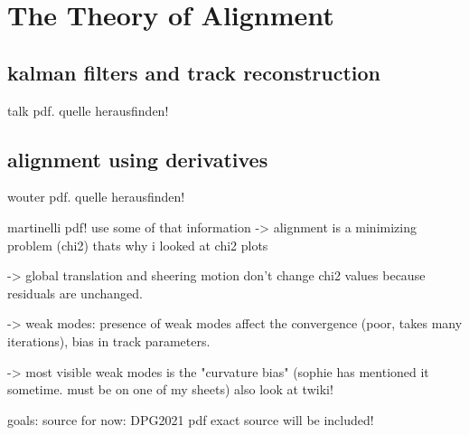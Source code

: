 \chapter{The Theory of Alignment}
\label{sec:alignTheory}

\section{kalman filters and track reconstruction}
\label{sec:kalman}
talk pdf. quelle herausfinden!
\section{alignment using derivatives}
\label{sec:derivatives}
wouter pdf. quelle herausfinden!

martinelli pdf! use some of that information
-> alignment is a minimizing problem (chi2) thats why i looked at chi2 plots

-> global translation and sheering motion don't change chi2 values because residuals are unchanged.

-> weak modes: presence of weak modes affect the convergence (poor, takes many iterations), bias in track parameters.

-> most visible weak modes is the "curvature bias" (sophie has mentioned it sometime. must be on one of my sheets)
also look at twiki!

goals:
source for now: DPG2021 pdf exact source will be included!
